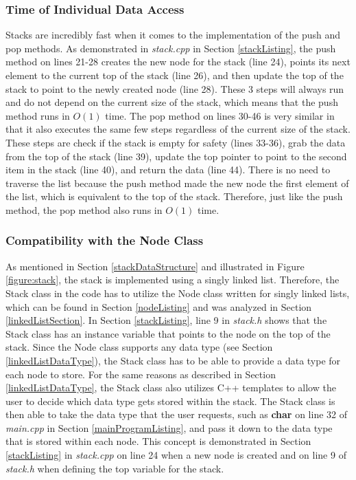 \documentclass[letterpaper, 10pt,DIV=13]{scrartcl}
\numberwithin{equation}{section} %
\numberwithin{figure}{section} %
\numberwithin{table}{section} %
\begin{document}
\subsubsection{Time of Individual Data Access}
Stacks are incredibly fast when it comes to the implementation of the push and pop methods. As demonstrated in \textit{stack.cpp} in Section \ref{stackListing},
the push method on lines 21-28 creates the new node for the stack (line 24), points its next element to the current top of the stack (line 26), and then update the top of the stack to
point to the newly created node (line 28). These 3 steps will always run and do not depend on the current size of the stack, which means that the push method runs in $O(1)$ time.
The pop method on lines 30-46 is very similar in that it also executes the same few steps regardless of the current size of the stack. These steps are check if the stack is empty for safety (lines 33-36),
grab the data from the top of the stack (line 39), update the top pointer to point to the second item in the stack (line 40), and return the data (line 44). There is no need to traverse the list because the push
method made the new node the first element of the list, which is equivalent to the top of the stack. Therefore, just like the push method, the pop method also runs in $O(1)$ time.

\subsubsection{Compatibility with the Node Class}
As mentioned in Section \ref{stackDataStructure} and illustrated in Figure \ref{figure:stack}, the stack is implemented using a singly linked list. Therefore, the Stack
class in the code has to utilize the Node class written for singly linked lists, which can be found in Section \ref{nodeListing} and was analyzed in Section \ref{linkedListSection}.
In Section \ref{stackListing}, line 9 in \textit{stack.h} shows that the Stack class has an instance variable that points to the node on the top of the stack. Since the Node
class supports any data type (see Section \ref{linkedListDataType}), the Stack class has to be able to provide a data type for each node to store. For the same reasons as
described in Section \ref{linkedListDataType}, the Stack class also utilizes C++ templates to allow the user to decide which data type gets stored within the stack.
The Stack class is then able to take the data type that the user requests, such as \textbf{char} on line 32 of \textit{main.cpp} in Section \ref{mainProgramListing},
and pass it down to the data type that is stored within each node. This concept is demonstrated in Section \ref{stackListing} in \textit{stack.cpp} on 
line 24 when a new node is created and on line 9 of \textit{stack.h} when defining the top variable for the stack.
\end{document}

